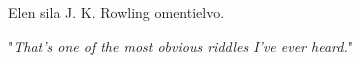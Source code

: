 Elen sila J. K. Rowling omentielvo.

"\emph{That’s one of the most obvious riddles I’ve ever heard.}"

